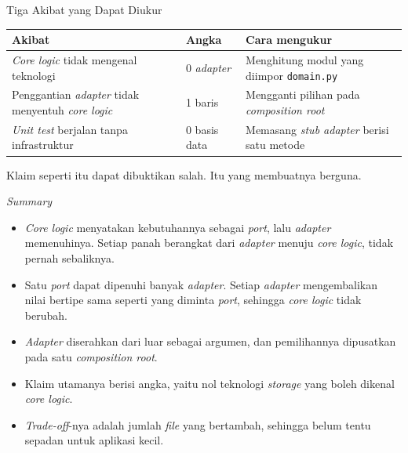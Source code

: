 \documentclass[aspectratio=169, table, 12pt]{beamer}
\begin{document}
\begin{frame}{{\Large Tiga Akibat yang Dapat Diukur}}
  \vspace{8pt}
  \centering
  \begin{tabularx}{0.95\textwidth}{|X|l|X|}
    \hline
    \textbf{Akibat} & \textbf{Angka} & \textbf{Cara mengukur} \\
    \hline
    \textit{Core logic} tidak mengenal teknologi & 0 \textit{adapter} & Menghitung modul yang diimpor \texttt{domain.py} \\
    \hline
    Penggantian \textit{adapter} tidak menyentuh \textit{core logic} & 1 baris & Mengganti pilihan pada \textit{composition root} \\
    \hline
    \textit{Unit test} berjalan tanpa infrastruktur & 0 basis data & Memasang \textit{stub adapter} berisi satu metode \\
    \hline
  \end{tabularx}

  \vspace{10pt}
  {\small Klaim seperti itu dapat dibuktikan salah. Itu yang membuatnya
  berguna.}
\end{frame}

\begin{frame}{{\Large \textit{Summary}}}
  \vspace{10pt}
  \begin{itemize}
    \item \textit{Core logic} menyatakan kebutuhannya sebagai \textit{port},
      lalu \textit{adapter} memenuhinya. Setiap panah berangkat dari
      \textit{adapter} menuju \textit{core logic}, tidak pernah sebaliknya.
    \item Satu \textit{port} dapat dipenuhi banyak \textit{adapter}. Setiap
      \textit{adapter} mengembalikan nilai bertipe sama seperti yang diminta
      \textit{port}, sehingga \textit{core logic} tidak berubah.
    \item \textit{Adapter} diserahkan dari luar sebagai argumen, dan
      pemilihannya dipusatkan pada satu \textit{composition root}.
    \item Klaim utamanya berisi angka, yaitu nol teknologi \textit{storage}
      yang boleh dikenal \textit{core logic}.
    \item \textit{Trade-off}-nya adalah jumlah \textit{file} yang bertambah,
      sehingga belum tentu sepadan untuk aplikasi kecil.
  \end{itemize}
\end{frame}
\end{document}
